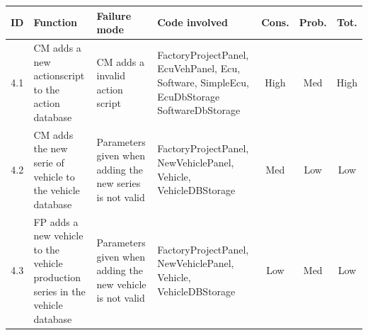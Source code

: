 \begin{landscape}
		\begin{table}[H]
			\begin{tabular}{ c | p{5cm} | p{5cm} | p{5cm} | c | c | c}
				\hline
				{\bf ID} & {\bf Function} & {\bf Failure mode} & {\bf Code involved} & 
				{\bf Cons.} & {\bf Prob.} & {\bf Tot.} \\ \hline
				4.1
				& CM adds a new actionscript to the action database
				& CM adds a invalid action script
				& FactoryProjectPanel, EcuVehPanel, Ecu, Software, SimpleEcu, EcuDbStorage
				SoftwareDbStorage
				& High & Med & High \\ \hline
				4.2
				& CM adds the new serie of vehicle to the vehicle database
				& Parameters given when adding the new series is not valid
				& FactoryProjectPanel, NewVehiclePanel, Vehicle, VehicleDBStorage
				& Med & Low & Low \\ \hline
				4.3
				& FP adds a new vehicle to the vehicle production series in the vehicle database
				& Parameters given when adding the new vehicle is not valid
				& FactoryProjectPanel, NewVehiclePanel, Vehicle, VehicleDBStorage
				& Low & Med & Low \\ \hline

			\end{tabular}
		\end{table}


\end{landscape}